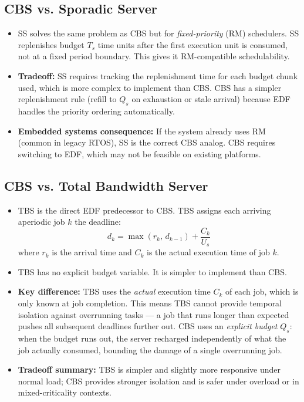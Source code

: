 \documentclass[conference]{IEEEtran}
\begin{document}
\subsection{CBS vs. Sporadic Server}
\begin{itemize}
  \item SS solves the same problem as CBS but for \emph{fixed-priority}
        (RM) schedulers. SS replenishes budget $T_s$ time units after
        the first execution unit is consumed, not at a fixed period
        boundary. This gives it RM-compatible schedulability.
  \item \textbf{Tradeoff:} SS requires tracking the replenishment time
        for each budget chunk used, which is more complex to implement
        than CBS. CBS has a simpler replenishment rule (refill to $Q_s$
        on exhaustion or stale arrival) because EDF handles the priority
        ordering automatically.
  \item \textbf{Embedded systems consequence:} If the system already
        uses RM (common in legacy RTOS), SS is the correct CBS analog.
        CBS requires switching to EDF, which may not be feasible on
        existing platforms.
\end{itemize}

\subsection{CBS vs. Total Bandwidth Server}
\begin{itemize}
  \item TBS is the direct EDF predecessor to CBS. TBS assigns each
        arriving aperiodic job $k$ the deadline:
        \begin{equation}
          d_k = \max(r_k,\, d_{k-1}) + \frac{C_k}{U_s}
          \label{eq:tbs}
        \end{equation}
        where $r_k$ is the arrival time and $C_k$ is the actual
        execution time of job $k$.
  \item TBS has no explicit budget variable. It is simpler to implement
        than CBS.
  \item \textbf{Key difference:} TBS uses the \emph{actual} execution
        time $C_k$ of each job, which is only known at job completion.
        This means TBS cannot provide temporal isolation against
        overrunning tasks --- a job that runs longer than expected
        pushes all subsequent deadlines further out. CBS uses an
        \emph{explicit budget} $Q_s$: when the budget runs out, the
        server recharged independently of what the job actually consumed,
        bounding the damage of a single overrunning job.
  \item \textbf{Tradeoff summary:} TBS is simpler and slightly more
        responsive under normal load; CBS provides stronger isolation
        and is safer under overload or in mixed-criticality contexts.
\end{itemize}
\end{document}

